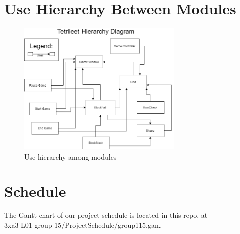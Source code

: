 \documentclass[12pt, titlepage]{article}
\begin{document}
\section{Use Hierarchy Between Modules} \label{SecUse}
\begin{figure}[H]
\centering
\includegraphics[width=0.7\textwidth]{Heirarchy.png}
\caption{Use hierarchy among modules}
\label{FigUH}
\end{figure}


\section{Schedule} \label{SecUse}

The Gantt chart of our project schedule is located in this repo, at\\ 3xa3-L01-group-15/ProjectSchedule/group115.gan.
\end{document}
